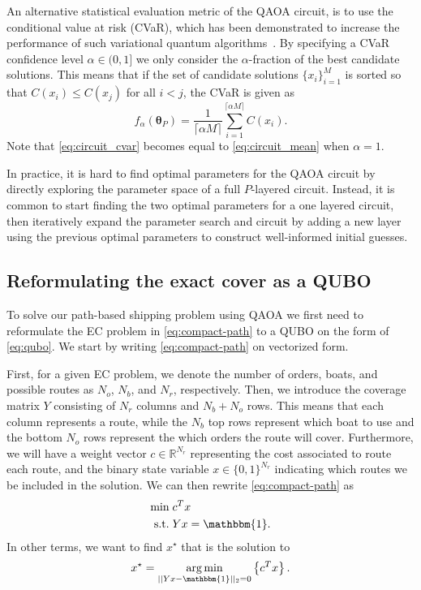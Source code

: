 \documentclass{article}
\newcommand{\argmin}{\operatorname*{arg\,min}}
\newcommand{\boldtheta}{\boldsymbol{\theta}}
\begin{document}
An alternative statistical evaluation metric of the QAOA circuit, is to use the conditional value at risk (CVaR), which has been demonstrated to increase the performance of such variational quantum algorithms~\cite{Barkoutsos2020improving}. By specifying a CVaR confidence level $\alpha \in (0, 1]$ we only consider the $\alpha$-fraction of the best candidate solutions. This means that if the set of candidate solutions $\{x_i\}_{i=1}^M$ is sorted so that $C(x_i) \leq C(x_j)$ for all $i < j$, the CVaR is given as
\begin{equation}
    f_{\alpha}(\boldtheta_P) = \frac{1}{\lceil \alpha M \rceil}\sum_{i=1}^{\lceil \alpha M \rceil} C(x_i).
    \label{eq:circuit_cvar}
\end{equation}
Note that \eqref{eq:circuit_cvar} becomes equal to \eqref{eq:circuit_mean}  when $\alpha = 1$.

In practice, it is hard to find optimal parameters for the QAOA circuit by directly exploring the parameter space of a full $P$-layered circuit. Instead, it is common to start finding the two optimal parameters for a one layered circuit, then iteratively expand the parameter search and circuit by adding a new layer using the previous optimal parameters to construct well-informed initial guesses. 


\subsection{Reformulating the exact cover as a QUBO}

To solve our path-based shipping problem using QAOA we first need to reformulate the EC problem in \eqref{eq:compact-path} to a QUBO on the form of \eqref{eq:qubo}. We start by writing \eqref{eq:compact-path} on vectorized form.

First, for a given EC problem, we denote the number of orders, boats, and possible routes as $N_o$, $N_b$, and $N_r$, respectively. Then, we introduce the coverage matrix $Y$ consisting of $N_r$ columns and $N_b + N_o$ rows.
This means that each column represents a route, while the $N_b$ top rows represent which boat to use and the bottom $N_o$ rows represent the which orders the route will cover.
Furthermore, we will have a weight vector $c \in \mathbb{R}^{N_r}$ representing the cost associated to route each route, and the binary state variable $x \in \{0, 1\}^{N_r}$ indicating which routes we be included in the solution.
We can then rewrite \eqref{eq:compact-path} as
\begin{subequations}
    \begin{align}
      \text{min}& \; c^T x \label{eq:vectorized-ec-1}\\
      \text{s.t.}& \; Y x = \mathbbm{1}. \label{eq:vectorized_ec-2}
    \end{align}
    \label{eq:vectorized_ec}
\end{subequations}
In other terms, we want to find $x^{\star}$ that is the solution to
\begin{equation}
     x^\star = \argmin_{||Y x - \mathbbm{1}||_2 = 0} \left\{ c^T x \right\}.
     \label{eq:standard-ec}
\end{equation}
\end{document}
